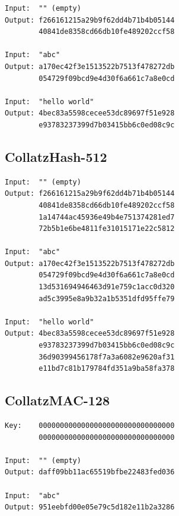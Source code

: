 \documentclass[11pt,a4paper]{article}
\begin{document}
\begin{verbatim}
Input:  "" (empty)
Output: f266161215a29b9f62dd4b71b4b05144
        40841de8358cd66db10fe489202ccf58

Input:  "abc"
Output: a170ec42f3e1513522b7513f478272db
        054729f09bcd9e4d30f6a661c7a8e0cd

Input:  "hello world"
Output: 4bec83a5598cecee53dc89697f51e928
        e93783237399d7b03415bb6c0ed08c9c
\end{verbatim}

\subsection{CollatzHash-512}

\begin{verbatim}
Input:  "" (empty)
Output: f266161215a29b9f62dd4b71b4b05144
        40841de8358cd66db10fe489202ccf58
        1a14744ac45936e49b4e751374281ed7
        72b5b1e6be4811fe31015171e22c5812

Input:  "abc"
Output: a170ec42f3e1513522b7513f478272db
        054729f09bcd9e4d30f6a661c7a8e0cd
        13d531694946463d91e759c1acc0d320
        ad5c3995e8a9b32a1b5351dfd95ffe79

Input:  "hello world"
Output: 4bec83a5598cecee53dc89697f51e928
        e93783237399d7b03415bb6c0ed08c9c
        36d90399456178f7a3a6082e9620af31
        e11bd7c81b179784fd351a9ba58fa378
\end{verbatim}

\subsection{CollatzMAC-128}

\begin{verbatim}
Key:    00000000000000000000000000000000
        00000000000000000000000000000000

Input:  "" (empty)
Output: daff09bb11ac65519bfbe22483fed036

Input:  "abc"
Output: 951eebfd00e05e79c5d182e11b2a3286
\end{verbatim}
\end{document}

